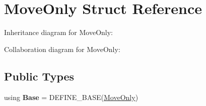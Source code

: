 \hypertarget{class_move_only}{}\section{Move\+Only Struct Reference}
\label{class_move_only}


Inheritance diagram for Move\+Only\+:


Collaboration diagram for Move\+Only\+:
\subsection*{Public Types}
\begin{DoxyCompactItemize}
\item 
\mbox{\label{class_move_only_a1e077ca1c7792ad59c4a1d00e5255a9e}} 
using {\bfseries Base} = D\+E\+F\+I\+N\+E\+\_\+\+B\+A\+SE(\mbox{\hyperlink{class_move_only}{Move\+Only}})
\end{DoxyCompactItemize}
